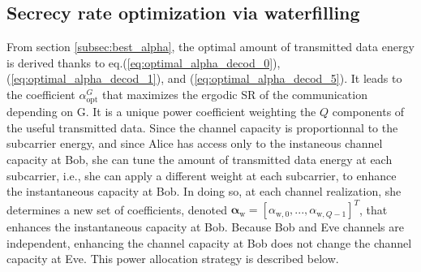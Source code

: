 \documentclass[journal,comsoc]{IEEEtran}
\newcommand{\mat}[1]{\boldsymbol{\mathrm{#1}}}
\begin{document}
\subsection{Secrecy rate optimization via waterfilling}
\label{subsec:perf_waterf}
From section \ref{subsec:best_alpha}, the optimal amount of transmitted data energy is derived thanks to eq.(\ref{eq:optimal_alpha_decod_0}), (\ref{eq:optimal_alpha_decod_1}), and (\ref{eq:optimal_alpha_decod_5}). It leads to the coefficient $\alpha_{\text{opt}}^G$ that maximizes the ergodic SR of the communication depending on $\mat{G}$. It is a unique power coefficient weighting the $Q$ components of the useful transmitted data.  Since the channel capacity is proportionnal to the subcarrier energy, and since Alice has access only to the instaneous channel capacity at Bob, she can tune the amount of transmitted data energy at each subcarrier, i.e., she can apply a different weight at each subcarrier, to enhance the instantaneous capacity at Bob. In doing so, at each channel realization, she determines a new set of coefficients, denoted $\boldsymbol\alpha_{\text{w}} = [\alpha_{\text{w},0},...,\alpha_{\text{w},Q-1}]^T $, that enhances the instantaneous capacity at Bob. Because Bob and Eve channels are independent, enhancing the channel capacity at Bob does not change the channel capacity at Eve. This power allocation strategy is described below. 
\end{document}
